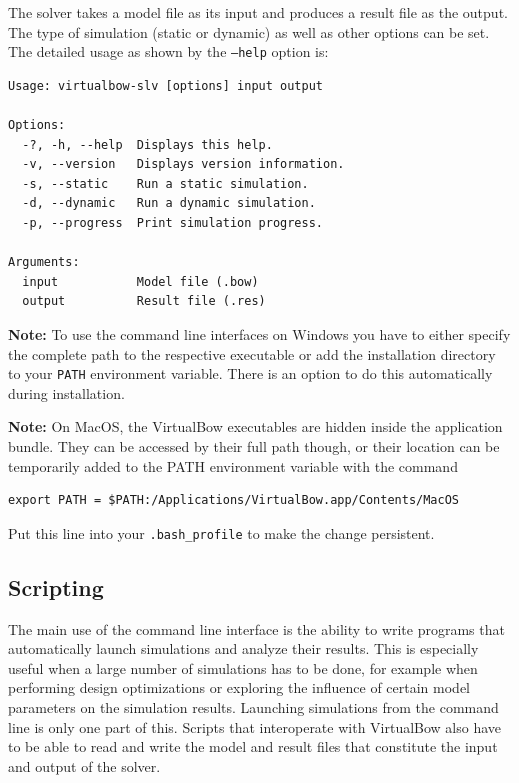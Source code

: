 \documentclass[12pt]{article}
\begin{document}
\bigskip

The solver takes a model file as its input and produces a result file as the output.
The type of simulation (static or dynamic) as well as other options can be set.
The detailed usage as shown by the \texttt{--help} option is:

\bigskip

\begin{framed}
\begin{verbatim}
Usage: virtualbow-slv [options] input output

Options:
  -?, -h, --help  Displays this help.
  -v, --version   Displays version information.
  -s, --static    Run a static simulation.
  -d, --dynamic   Run a dynamic simulation.
  -p, --progress  Print simulation progress.

Arguments:
  input           Model file (.bow)
  output          Result file (.res)
\end{verbatim}
\end{framed}

\bigskip

\textbf{Note:} To use the command line interfaces on Windows you have to either specify the complete path to the respective executable or add the installation directory to your \texttt{PATH} environment variable.
There is an option to do this automatically during installation.

\bigskip

\textbf{Note:} On MacOS, the VirtualBow executables are hidden inside the application bundle.
They can be accessed by their full path though, or their location can be temporarily added to the PATH environment variable with the command

\begin{framed}
\begin{verbatim}
export PATH = $PATH:/Applications/VirtualBow.app/Contents/MacOS
\end{verbatim}
\end{framed}

Put this line into your \texttt{.bash\_profile} to make the change persistent.

\newpage
\subsection{Scripting}

The main use of the command line interface is the ability to write programs that automatically launch simulations and analyze their results.
This is especially useful when a large number of simulations has to be done, for example when performing design optimizations or exploring the influence of certain model parameters on the simulation results.
Launching simulations from the command line is only one part of this.
Scripts that interoperate with VirtualBow also have to be able to read and write the model and result files that constitute the input and output of the solver.
\end{document}
